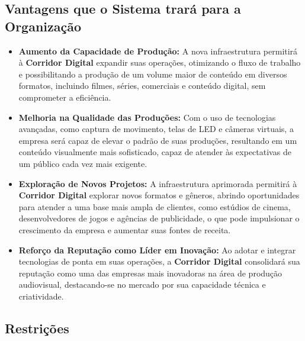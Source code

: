 \subsection{Vantagens que o Sistema trará para a Organização}

\begin{itemize}
    \item \textbf{Aumento da Capacidade de Produção:} A nova infraestrutura permitirá à \textbf{Corridor Digital} expandir suas operações, otimizando o fluxo de trabalho e possibilitando a produção de um volume maior de conteúdo em diversos formatos, incluindo filmes, séries, comerciais e conteúdo digital, sem comprometer a eficiência.
    
    \item \textbf{Melhoria na Qualidade das Produções:} Com o uso de tecnologias avançadas, como captura de movimento, telas de LED e câmeras virtuais, a empresa será capaz de elevar o padrão de suas produções, resultando em um conteúdo visualmente mais sofisticado, capaz de atender às expectativas de um público cada vez mais exigente.
    
    \item \textbf{Exploração de Novos Projetos:} A infraestrutura aprimorada permitirá à \textbf{Corridor Digital} explorar novos formatos e gêneros, abrindo oportunidades para atender a uma base mais ampla de clientes, como estúdios de cinema, desenvolvedores de jogos e agências de publicidade, o que pode impulsionar o crescimento da empresa e aumentar suas fontes de receita.
    
    \item \textbf{Reforço da Reputação como Líder em Inovação:} Ao adotar e integrar tecnologias de ponta em suas operações, a \textbf{Corridor Digital} consolidará sua reputação como uma das empresas mais inovadoras na área de produção audiovisual, destacando-se no mercado por sua capacidade técnica e criatividade.
\end{itemize}

\subsection{Restrições}

